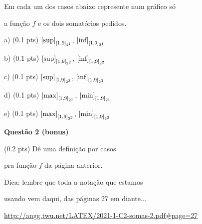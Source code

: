 \documentclass[oneside,12pt]{article}
\begin{document}
\msk

Em cada um dos casos abaixo represente num gráfico só

a função $f$ e os dois somatórios pedidos.

\msk

a) (0.1 pts) $\text{[sup]}_{[1,9]_{2^1}}$, $\text{[inf]}_{[1,9]_{2^1}}$

b) (0.1 pts) $\text{[sup]}_{[1,9]_{2^2}}$, $\text{[inf]}_{[1,9]_{2^2}}$

c) (0.1 pts) $\text{[sup]}_{[1,9]_{2^3}}$, $\text{[inf]}_{[1,9]_{2^3}}$

d) (0.1 pts) $\text{[max]}_{[1,9]_{2^1}}$, $\text{[min]}_{[1,9]_{2^1}}$

e) (0.1 pts) $\text{[max]}_{[1,9]_{2^2}}$, $\text{[min]}_{[1,9]_{2^2}}$



\newpage


{\bf Questão 2 (bonus)}

(0.2 pts) Dê uma definição por casos

pra função $f$ da página anterior.



\bsk
\bsk
\bsk
\bsk

Dica: lembre que toda a notação que estamos

usando vem daqui, das páginas 27 em diante...

\ssk

{\footnotesize

\url{http://angg.twu.net/LATEX/2021-1-C2-somas-2.pdf#page=27}

}


\newpage


\long{}
\long{}
\long{}
\long{}
\long{}
\long{}
\long{}
\long{}
\long{}
\long{}
\long{}
\end{document}
